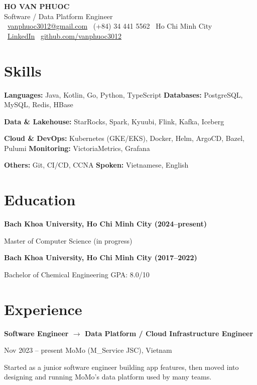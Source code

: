 \documentclass[10pt,a4paper]{article}
\newcommand{\role}[3]{%
  \textbf{#1}\par
  {\color{muted}\small #2 \textbullet{} #3}\par\vspace{2pt}}
\begin{document}
\begin{center}
  {\color{accent}\Huge\bfseries\scshape HO VAN PHUOC}\\[3pt]
  {\color{muted}\large Software / Data Platform Engineer}\\[6pt]
  \small
  \faEnvelope[regular]~\href{mailto:vanphuoc3012@gmail.com}{vanphuoc3012@gmail.com} \quad
  \faPhone*~(+84) 34 441 5562 \quad
  \faMapMarker*~Ho Chi Minh City \\[3pt]
  \faLinkedin~\href{https://www.linkedin.com/in/phuoc-ho-van/}{LinkedIn} \quad
  \faGithub~\href{https://github.com/vanphuoc3012}{github.com/vanphuoc3012}
\end{center}
\vspace{2pt}

\section{Skills}
\textbf{Languages:} Java, Kotlin, Go, Python, TypeScript \quad
\textbf{Databases:} PostgreSQL, MySQL, Redis, HBase\par\smallskip
\textbf{Data \& Lakehouse:} StarRocks, Spark, Kyuubi, Flink, Kafka, Iceberg\par\smallskip
\textbf{Cloud \& DevOps:} Kubernetes (GKE/EKS), Docker, Helm, ArgoCD, Bazel, Pulumi \quad
\textbf{Monitoring:} VictoriaMetrics, Grafana\par\smallskip
\textbf{Others:} Git, CI/CD, CCNA \quad
\textbf{Spoken:} Vietnamese, English

\section{Education}
\textbf{Bach Khoa University, Ho Chi Minh City (2024--present)}\par
Master of Computer Science (in progress)\par
\smallskip
\textbf{Bach Khoa University, Ho Chi Minh City (2017--2022)}\par
Bachelor of Chemical Engineering \textbullet{} GPA: 8.0/10

\section{Experience}
\role{Software Engineer $\rightarrow$ Data Platform / Cloud Infrastructure Engineer}{Nov 2023 -- present}{MoMo (M\_Service JSC), Vietnam}
Started as a junior software engineer building app features, then moved into designing and running MoMo's data platform used by many teams.
\end{document}
